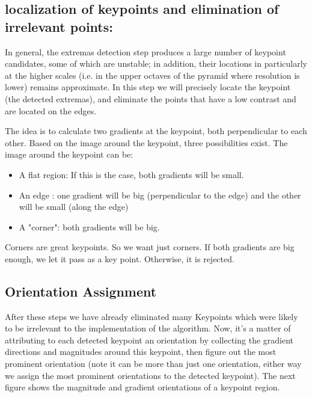 \subsection{localization  of keypoints and elimination of irrelevant points:}

In general, the extremas detection step produces a large number of keypoint candidates, some of which are unstable;  in addition, their locations in particularly at  the higher scales (i.e. in the upper octaves of the pyramid where resolution is lower) remains approximate. In this step  we will precisely locate the keypoint (the detected extremas), and eliminate the points that have a low contrast and are located on the edges.

The idea is to calculate two gradients at the keypoint, both perpendicular to each other. Based on the image around the keypoint, three possibilities exist. The image around the keypoint can be:
\begin{itemize}

\item A flat region: If this is the case, both gradients will be small.
\item  An edge :  one gradient will be big (perpendicular to the edge) and the other will be small (along the edge)
\item A "corner":  both gradients will be big.
\end{itemize}
Corners are great keypoints. So we want just corners. If both gradients are big enough, we let it pass as a key point. Otherwise, it is rejected.




\subsection{Orientation Assignment }


After these steps we have already eliminated many Keypoints which were likely to be irrelevant to the implementation of the algorithm. Now, it’s a matter of attributing to each detected keypoint 
an orientation by collecting the gradient directions and magnitudes around this keypoint, then figure out the most prominent orientation (note it can be more than just one orientation, either way we assign the most prominent orientations to the detected keypoint). The next figure shows the magnitude and gradient orientations of a keypoint region.

